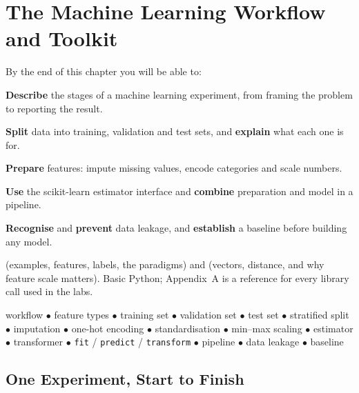 \chapter{The Machine Learning Workflow and Toolkit}\label{ch:workflow}

\begin{outcomes}
By the end of this chapter you will be able to:
\begin{tight}
  \item \textbf{Describe} the stages of a machine learning experiment, from
        framing the problem to reporting the result.
  \item \textbf{Split} data into training, validation and test sets, and
        \textbf{explain} what each one is for.
  \item \textbf{Prepare} features: impute missing values, encode categories and
        scale numbers.
  \item \textbf{Use} the scikit-learn estimator interface and \textbf{combine}
        preparation and model in a pipeline.
  \item \textbf{Recognise} and \textbf{prevent} data leakage, and
        \textbf{establish} a baseline before building any model.
\end{tight}
\end{outcomes}

\begin{prereq}
 (examples, features, labels, the paradigms) and
 (vectors, distance, and why feature scale matters). Basic Python;
Appendix~A is a reference for every library call used in the labs.
\end{prereq}

\begin{keyterms}
workflow $\bullet$ feature types $\bullet$ training set $\bullet$ validation set
$\bullet$ test set $\bullet$ stratified split $\bullet$ imputation $\bullet$
one-hot encoding $\bullet$ standardisation $\bullet$ min--max scaling $\bullet$
estimator $\bullet$ transformer $\bullet$ \texttt{fit} / \texttt{predict} /
\texttt{transform} $\bullet$ pipeline $\bullet$ data leakage $\bullet$ baseline
\end{keyterms}

\section{One Experiment, Start to Finish}

